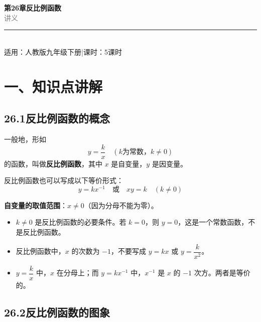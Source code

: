 \documentclass[12pt, a4paper]{ctexart}
\begin{document}
\begin{center}
{\Huge\bfseries\textcolor{mainblue}{第26章\quad 反比例函数}}\\[12pt]
{\Large\textcolor{gray}{讲\quad 义}}\\[8pt]
\rule{0.6\textwidth}{1pt}\\[8pt]
{\normalsize 适用：人教版\quad 九年级下册\quad |\quad 课时：5课时}
\end{center}
\vspace{10pt}

\section*{\textcolor{mainblue}{一、知识点讲解}}

\subsection*{26.1\quad 反比例函数的概念}

\begin{knowledgebox}[1. 反比例函数的定义]
一般地，形如
\[
  y = \frac{k}{x} \quad (k \text{为常数，} k \neq 0)
\]
的函数，叫做\textbf{反比例函数}，其中 $x$ 是自变量，$y$ 是因变量。

\medskip
反比例函数也可以写成以下等价形式：
\[
  y = kx^{-1} \quad \text{或} \quad xy = k \quad (k \neq 0)
\]

\medskip
\textbf{自变量的取值范围}：$x \neq 0$（因为分母不能为零）。
\end{knowledgebox}

\begin{warnbox}[易错提醒]
\begin{itemize}[leftmargin=2em]
  \item $k \neq 0$ 是反比例函数的必要条件。若 $k = 0$，则 $y = 0$，这是一个常数函数，不是反比例函数。
  \item 反比例函数中，$x$ 的次数为 $-1$，不要写成 $y = kx$ 或 $y = \dfrac{k}{x^2}$。
  \item $y = \dfrac{k}{x}$ 中，$x$ 在分母上；而 $y = kx^{-1}$ 中，$x^{-1}$ 是 $x$ 的 $-1$ 次方。两者是等价的。
\end{itemize}
\end{warnbox}

\subsection*{26.2\quad 反比例函数的图象}
\end{document}
